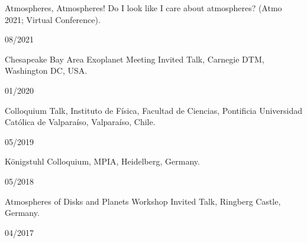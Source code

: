 \documentclass[12pt, a4paper]{article} %
\begin{document}
\begin{minipage}[t]{0.7\textwidth}
\begin{flushleft}%
  \setlength{\leftskip}{0.2cm}%
Atmospheres, Atmospheres! Do I look like I care about atmospheres? (Atmo 2021; Virtual Conference).
\end{flushleft}
\end{minipage}
\begin{minipage}[t]{0.3\textwidth}
\hfill 08/2021
\end{minipage}
\vspace{0.2cm}

\begin{minipage}[t]{0.7\textwidth}
\begin{flushleft}%
  \setlength{\leftskip}{0.2cm}%
Chesapeake Bay Area Exoplanet Meeting Invited Talk, Carnegie DTM, Washington DC, USA.
\end{flushleft}
\end{minipage}
\begin{minipage}[t]{0.3\textwidth}
\hfill 01/2020
\end{minipage}
\vspace{0.2cm}

\begin{minipage}[t]{0.7\textwidth}
\begin{flushleft}%
  \setlength{\leftskip}{0.2cm}%
Colloquium Talk, Instituto de F\'isica, Facultad de Ciencias, Pontificia Universidad Cat\'olica de Valpara\'iso, Valpara\'iso, Chile.
\end{flushleft}
\end{minipage}
\begin{minipage}[t]{0.3\textwidth}
\hfill 05/2019
\end{minipage}
\vspace{0.2cm}

\begin{minipage}[t]{0.7\textwidth}
\begin{flushleft}%
  \setlength{\leftskip}{0.2cm}%
Königstuhl Colloquium, MPIA, Heidelberg, Germany.
\end{flushleft}
\end{minipage}
\begin{minipage}[t]{0.3\textwidth}
\hfill 05/2018
\end{minipage}
\vspace{0.2cm}

\begin{minipage}[t]{0.7\textwidth}
\begin{flushleft}%
  \setlength{\leftskip}{0.2cm}%
Atmospheres of Disks and Planets Workshop Invited Talk, Ringberg Castle, Germany.
\end{flushleft}
\end{minipage}
\begin{minipage}[t]{0.3\textwidth}
\hfill 04/2017
\end{minipage}
\vspace{0.2cm}
\end{document}
